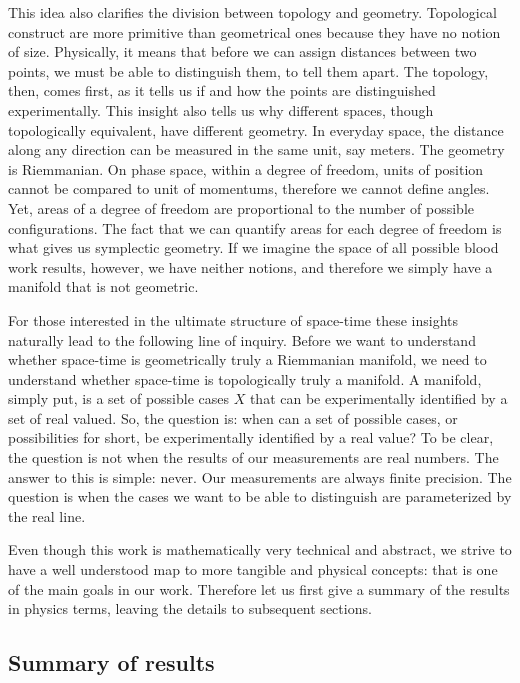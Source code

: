 \documentclass[12pt]{iopart}
\begin{document}
This idea also clarifies the division between topology and geometry. Topological construct are more primitive than geometrical ones because they have no notion of size. Physically, it means that before we can assign distances between two points, we must be able to distinguish them, to tell them apart. The topology, then, comes first, as it tells us if and how the points are distinguished experimentally. This insight also tells us why different spaces, though topologically equivalent, have different geometry. In everyday space, the distance along any direction can be measured in the same unit, say meters. The geometry is Riemmanian. On phase space, within a degree of freedom, units of position cannot be compared to unit of momentums, therefore we cannot define angles. Yet, areas of a degree of freedom are proportional to the number of possible configurations. The fact that we can quantify areas for each degree of freedom is what gives us symplectic geometry. If we imagine the space of all possible blood work results, however, we have neither notions, and therefore we simply have a manifold that is not geometric.

For those interested in the ultimate structure of space-time these insights naturally lead to the following line of inquiry. Before we want to understand whether space-time is geometrically truly a Riemmanian manifold, we need to understand whether space-time is topologically truly a manifold. A manifold, simply put, is a set of possible cases $X$ that can be experimentally identified by a set of real valued. So, the question is: when can a set of possible cases, or possibilities for short, be experimentally identified by a real value? To be clear, the question is not when the results of our measurements are real numbers. The answer to this is simple: never. Our measurements are always finite precision. The question is when the cases we want to be able to distinguish are parameterized by the real line.

Even though this work is mathematically very technical and abstract, we strive to have a well understood map to more tangible and physical concepts: that is one of the main goals in our work. Therefore let us first give a summary of the results in physics terms, leaving the details to subsequent sections.

\subsection{Summary of results}
\end{document}
